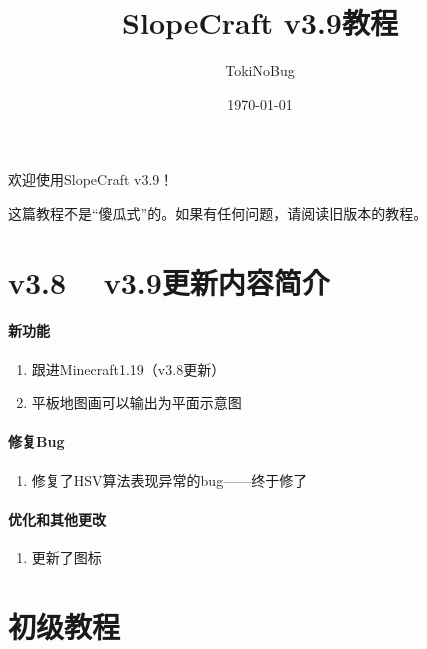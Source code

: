 \documentclass[UTF8]{ctexart}
\title{SlopeCraft v3.9教程}
\author{TokiNoBug}
\date{\today}
\begin{document}
\maketitle

欢迎使用SlopeCraft v3.9！

这篇教程不是“傻瓜式”的。如果有任何问题，请阅读旧版本的教程。

\section{v3.8 ~ v3.9更新内容简介}

\paragraph{新功能}
\begin{enumerate}
    \item 跟进Minecraft1.19（v3.8更新）
    \item 平板地图画可以输出为平面示意图
\end{enumerate}

\paragraph{修复Bug}
\begin{enumerate}
    \item 修复了HSV算法表现异常的bug——终于修了
\end{enumerate}

\paragraph{优化和其他更改}
\begin{enumerate}
    \item 更新了图标
\end{enumerate}

\pagebreak
\section{初级教程}
\end{document}

